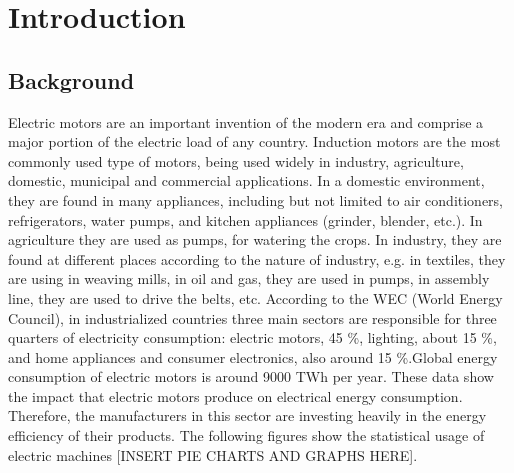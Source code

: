 \chapter{Introduction} %
\label{Chapter1}

\section{Background}

Electric motors are an important invention of the modern era and comprise a major portion of the electric load of any country. Induction motors are the most commonly used type of motors, being used widely in industry, agriculture, domestic, municipal and commercial applications. In a domestic environment, they are found in many appliances, including but not limited to air conditioners, refrigerators, water pumps, and kitchen appliances (grinder, blender, etc.). In agriculture they are used as pumps, for watering the crops. In industry, they are found at different places according to the nature of industry, e.g. in textiles, they are using in weaving mills, in oil and gas, they are used in pumps, in assembly line, they are used to drive the belts, etc. According to the WEC (World Energy Council), in industrialized countries three main sectors are responsible for three quarters of electricity consumption: electric motors, 45 \%, lighting, about 15 \%, and home appliances and consumer electronics, also around 15 \%.Global energy consumption of electric motors is around 9000 TWh per year\cite{tandel2019energy}. These data show the impact that electric motors produce on electrical energy consumption. Therefore, the manufacturers in this sector are investing heavily in the energy efficiency of their products. The following figures show the statistical usage of electric machines [INSERT PIE CHARTS AND GRAPHS HERE].

